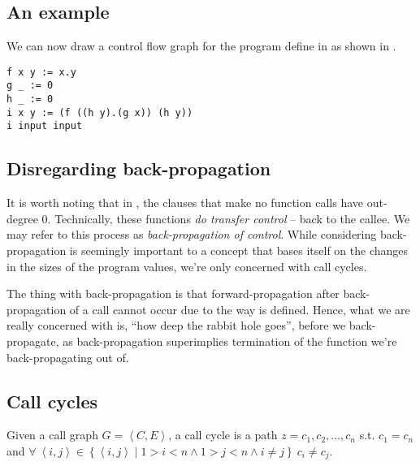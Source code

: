\subsection{An example}

We can now draw a control flow graph for the program define in
 as shown in .

\begin{lstlisting}[label=listing:cfg-sample-1,caption={A sample \D{} program, always returning \mono{0.0.0}.}]
f x y := x.y
g _ := 0
h _ := 0
i x y := (f ((h y).(g x)) (h y))
i input input
\end{lstlisting}


\subsection{Disregarding back-propagation}

It is worth noting that in , the clauses that
make no function calls have out-degree $0$. Technically, these functions
\emph{do transfer control} -- back to the callee. We may refer to this process
as \emph{back-propagation of control}. While considering back-propagation is
seemingly important to a concept that bases itself on the changes in the sizes
of the program values, we're only concerned with call cycles.

The thing with back-propagation is that forward-propagation after
back-propagation of a call cannot occur due to the way \D{} is defined. Hence,
what we are really concerned with is, ``how deep the rabbit hole goes'', before
we back-propagate, as back-propagation superimplies termination of the function
we're back-propagating out of.

\subsection{Call cycles}

\begin{definition}\label{definition:call-cycle} Given a call graph $G =
\left\langle C,E \right\rangle$, a call cycle is a path $z=c_1,c_2,\ldots,c_n$
s.t. $c_1=c_n$ and $\forall\ \left\langle i, j \right\rangle \in \left\{
\left\langle i,j \right\rangle \mid 1>i< n \wedge 1>j< n \wedge i\neq
j\right\}\ c_i\neq c_j$.\end{definition}

